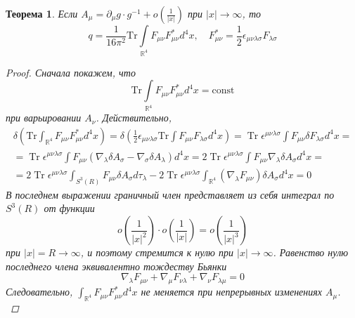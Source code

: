 \documentclass[12pt]{article}
\newtheorem{theorem}{Теорема}[section]
\theoremstyle{definition}
\begin{document}
\begin{theorem}
    Если $A_\mu=\partial_\mu g\cdot g^{-1}+o\left(\frac{1}{|x|}\right)$ при $|x|\rightarrow\infty$, то
    \begin{equation}
        q=\frac{1}{16\pi^2}\text{Tr}\int\limits_{\mathbb{R}^4}F_{\mu\nu}F^*_{\mu\nu}d^4x,\quad F^*_{\mu\nu}=\frac{1}{2}\epsilon_{\mu\nu\lambda\sigma}F_{\lambda\sigma}
    \end{equation}
    \begin{proof}
        Сначала покажем, что
        \begin{equation}
            \text{Tr}\int\limits_{\mathbb{R}^4}F_{\mu\nu}F^*_{\mu\nu}d^4x=\text{const}
        \end{equation}
        при варьировании $A_\nu$. Действительно,
        \begin{multline}
            \delta\left(\text{Tr}\int_{\mathbb{R}^4} F_{\mu \nu} F_{\mu \nu}^* d^4 x\right)=\delta\left(\frac{1}{2} \epsilon_{\mu \nu \lambda \sigma} \text{Tr} \int F_{\mu \nu} F_{\lambda \sigma} d^4 x\right)=\operatorname{Tr} \epsilon^{\mu \nu \lambda \sigma} \int F_{\mu \nu} \delta F_{\lambda \sigma} d^4 x=\\=\operatorname{Tr} \epsilon^{\mu \nu \lambda \sigma}\int F_{\mu \nu}\left(\nabla_\lambda \delta A_\sigma-\nabla_\sigma \delta A_\lambda\right)d^4x=2\operatorname{Tr}\epsilon^{\mu \nu \lambda \sigma} \int F_{\mu \nu} \nabla_\lambda \delta A_\sigma d^4 x=\\=2 \operatorname{Tr}\epsilon^{\mu \nu \lambda \sigma} \int_{S^3(R)}F_{\mu \nu} \delta A_\sigma d\tau_\lambda-2 \operatorname{Tr} \epsilon^{\mu\nu\lambda \sigma} \int_{\mathbb{R}^4}\left(\nabla_\lambda F_{\mu\nu}\right) \delta A_\sigma d^4 x=0 
        \end{multline}
        В последнем выражении граничный член представляет из себя интеграл по $S^3(R)$ от функции
        \begin{equation}
            o\left(\frac{1}{|x|^2}\right) \cdot o\left(\frac{1}{|x|}\right)=o\left(\frac{1}{|x|^3}\right)
        \end{equation}
        при $|x|=R \rightarrow \infty$, и поэтому стремится к нулю при $|x| \rightarrow \infty$. Равенство нулю последнего члена эквивалентно тождеству Бьянки
        \begin{equation}
            \nabla_\lambda F_{\mu \nu}+\nabla_\mu F_{\nu \lambda}+\nabla_\nu F_{\lambda \mu}=0
        \end{equation}
        Следовательно, $\int_{\mathbb{R}^4} F_{\mu \nu} F_{\mu \nu}^* d^4 x$ не меняется при непрерывных изменениях $A_\mu$.\\

\end{proof}
\end{theorem}
\end{document}
